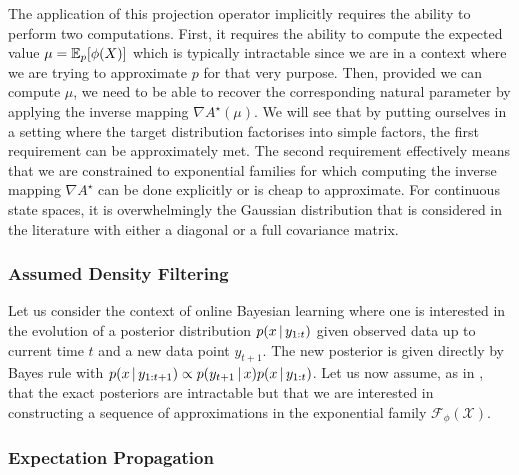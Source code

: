 The application of this projection operator implicitly requires the ability to perform two computations. First, it requires the ability to compute the expected value $\mu=\mathbb E_{p}[\phi(X)]$ which is typically intractable since we are in a context where we are trying to approximate $p$ for that very purpose. Then, provided we can compute $\mu$, we need to be able to recover the corresponding natural parameter by applying the inverse mapping $\nabla A^{\star}(\mu)$. We will see that by putting ourselves in a setting where the target distribution factorises into simple factors, the first requirement can be approximately met. The second requirement effectively means that we are constrained to exponential families for which computing the inverse mapping $\nabla A^{\star}$ can be done explicitly or is cheap to approximate. For continuous state spaces, it is overwhelmingly the Gaussian distribution that is considered in the literature with either a diagonal or a full covariance matrix. 
%
\subsubsection*{Assumed Density Filtering}
%
Let us consider the context of online Bayesian learning where one is interested in the evolution of a posterior distribution $p(x\,|\, y_{1:t})$ given observed data up to current time $t$ and a new data point $y_{t+1}$. The new posterior is given directly by Bayes rule with $p(x\,|\, y_{1:t+1})\propto p(y_{t+1}\,|\, x) p(x\,|\, y_{1:t})$. Let us now assume, as in \citet{opper98}, that the exact posteriors are intractable but that we are interested in constructing a sequence of approximations in the exponential family $\mathcal F_{\phi}(\mathcal X)$. 


%
\subsubsection*{Expectation Propagation}
%

